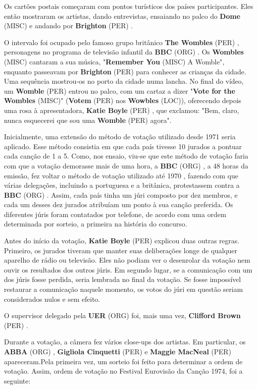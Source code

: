 \documentclass[12pt,a4paper]{article}
\begin{document}
Os cartões postais começaram com pontos turísticos dos países participantes. Eles então mostraram os artistas, dando entrevistas, ensaiando no palco do \textbf{Dome} (MISC) e andando por \textbf{Brighton} (PER) .

O intervalo foi ocupado pelo famoso grupo britânico \textbf{The Wombles} (PER) , personagens no programa de televisão infantil da \textbf{BBC} (ORG) . Os \textbf{Wombles} (MISC) cantaram a sua música, "\textbf{Remember You} (MISC) A Womble", enquanto passeavam por \textbf{Brighton} (PER) para conhecer as crianças da cidade. Uma sequência mostrou-os no porto da cidade numa lancha. No final do vídeo, um \textbf{Womble} (PER) entrou no palco, com um cartaz a dizer "\textbf{Vote for the Wombles} (MISC)" (\textbf{Votem} (PER) nos \textbf{Wowbles} (LOC)), oferecendo depois uma rosa à apresentadora, \textbf{Katie Boyle} (PER) , que exclamou: "Bem, claro, nunca esquecerei que sou uma \textbf{Womble} (PER) agora".

Inicialmente, uma extensão do método de votação utilizado desde 1971 seria aplicado. Esse método consistia em que cada país tivesse 10 jurados a pontuar cada canção de 1 a 5. Como, nos ensaio, viu-se que este método de votação faria com que a votação demorasse mais de uma hora, a \textbf{BBC} (ORG) , a 48 horas da emissão, fez voltar o método de votação utilizado até 1970 , fazendo com que várias delegações, incluindo a portuguesa e a britânica, protestassem contra a \textbf{BBC} (ORG) . Assim, cada país tinha um júri composto por dez membros, e cada um desses dez jurados atribuíam um ponto à sua canção preferida. Os diferentes júris foram contatados por telefone, de acordo com uma ordem determinada por sorteio, a primeira na história do concurso.

Antes do início da votação, \textbf{Katie Boyle} (PER) explicou duas outras regras. Primeiro, os jurados tiveram que manter suas deliberações longe de qualquer aparelho de rádio ou televisão. Eles não podiam ver o desenrolar da votação nem ouvir os resultados dos outros júris. Em segundo lugar, se a comunicação com um dos júris fosse perdida, seria lembrada no final da votação. Se fosse impossível restaurar a comunicação naquele momento, os votos do júri em questão seriam considerados nulos e sem efeito.

O supervisor delegado pela \textbf{UER} (ORG) foi, mais uma vez, \textbf{Clifford Brown} (PER) .

Durante a votação, a câmera fez vários close-ups dos artistas. Em particular, os \textbf{ABBA} (ORG) , \textbf{Gigliola Cinquetti} (PER) e \textbf{Maggie MacNeal} (PER) apareceram.Pela primeira vez, um sorteio foi feito para determinar a ordem de votação. Assim, ordem de votação no Festival Eurovisão da Canção 1974, foi a seguinte:
\end{document}
